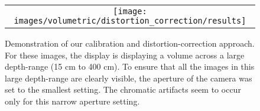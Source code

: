 \begin{figure} [ht]
\begin{center}
\begin{tabular}{c} 
\texttt{[image: images/volumetric/distortion\_correction/results]}
\end{tabular}
\end{center}
\label{fig:volumetric:distortion_correction:results} 
\caption{Demonstration of our calibration and distortion-correction approach. For these images, the display is displaying a volume across a large depth-range (15 cm to 400 cm). To ensure that all the images in this large depth-range are clearly visible, the aperture of the camera was set to the smallest setting. The chromatic artifacts seem to occur only for this narrow aperture setting.}
\end{figure} 
